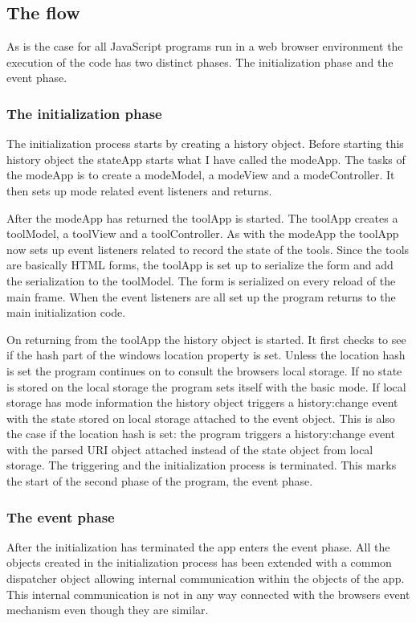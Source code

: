 \documentclass[english]{ifimaster}
\begin{document}
\subsection{The flow}
As is the case for all JavaScript programs run in a web browser environment the execution of the code has two distinct phases. The initialization phase and the event phase\parencite[p.317]{flanagan}.

\subsubsection{The initialization phase} 
The initialization process starts by creating a history object. Before starting this history object the stateApp starts what I have called the modeApp. The tasks of the modeApp is to create a modeModel, a modeView and a modeController. It then sets up mode related event listeners and returns.

After the modeApp has returned the toolApp is started. The toolApp creates a toolModel, a toolView and a toolController. As with the modeApp the toolApp now sets up event listeners related to record the state of the tools. Since the tools are basically HTML forms, the toolApp is set up to serialize the form and add the serialization to the toolModel. The form is serialized on every reload of the main frame. When the event listeners are all set up the program returns to the main initialization code.

On returning from the toolApp the history object is started. It first checks to see if the hash part of the windows location property is set. Unless the location hash is set the program continues on to consult the browsers local storage. If no state is stored on the local storage the program sets itself with the basic mode. If local storage has mode information the history object triggers a history:change event with the state stored on local storage attached to the event object. This is also the case if the location hash is set: the program triggers a history:change event with the parsed URI object attached instead of the state object from local storage. The triggering and the initialization process is terminated. This marks the start of the second phase of the program, the event phase.

\subsubsection{The event phase}
After the initialization has terminated the app enters the event phase. All the objects created in the initialization process has been extended with a common dispatcher object allowing internal communication within the objects of the app. This internal communication is not in any way connected with the browsers event mechanism even though they are similar.
\end{document}
